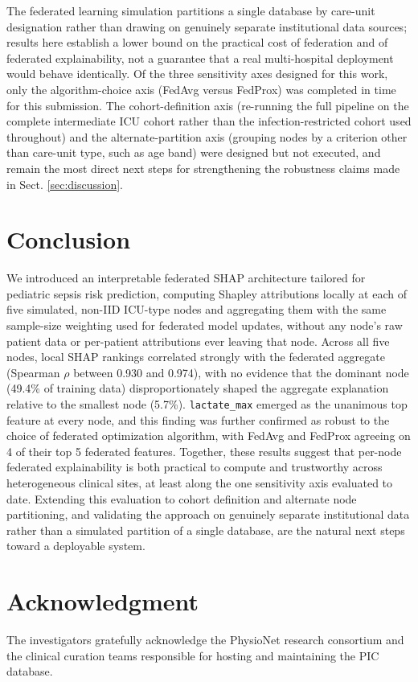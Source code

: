 \documentclass[runningheads]{llncs}
\begin{document}
The federated learning simulation partitions a single database by care-unit designation rather than drawing on genuinely separate institutional data sources; results here establish a lower bound on the practical cost of federation and of federated explainability, not a guarantee that a real multi-hospital deployment would behave identically. Of the three sensitivity axes designed for this work, only the algorithm-choice axis (FedAvg versus FedProx) was completed in time for this submission. The cohort-definition axis (re-running the full pipeline on the complete intermediate ICU cohort rather than the infection-restricted cohort used throughout) and the alternate-partition axis (grouping nodes by a criterion other than care-unit type, such as age band) were designed but not executed, and remain the most direct next steps for strengthening the robustness claims made in Sect. \ref{sec:discussion}.

\section{Conclusion}\label{sec:concl}

We introduced an interpretable federated SHAP architecture tailored for pediatric sepsis risk prediction, computing Shapley attributions locally at each of five simulated, non-IID ICU-type nodes and aggregating them with the same sample-size weighting used for federated model updates, without any node's raw patient data or per-patient attributions ever leaving that node. Across all five nodes, local SHAP rankings correlated strongly with the federated aggregate (Spearman $\rho$ between 0.930 and 0.974), with no evidence that the dominant node (49.4\% of training data) disproportionately shaped the aggregate explanation relative to the smallest node (5.7\%). \texttt{lactate\_max} emerged as the unanimous top feature at every node, and this finding was further confirmed as robust to the choice of federated optimization algorithm, with FedAvg and FedProx agreeing on 4 of their top 5 federated features. Together, these results suggest that per-node federated explainability is both practical to compute and trustworthy across heterogeneous clinical sites, at least along the one sensitivity axis evaluated to date. Extending this evaluation to cohort definition and alternate node partitioning, and validating the approach on genuinely separate institutional data rather than a simulated partition of a single database, are the natural next steps toward a deployable system.

\section*{Acknowledgment}
The investigators gratefully acknowledge the PhysioNet research consortium and the clinical curation teams responsible for hosting and maintaining the PIC database.



\end{document}
